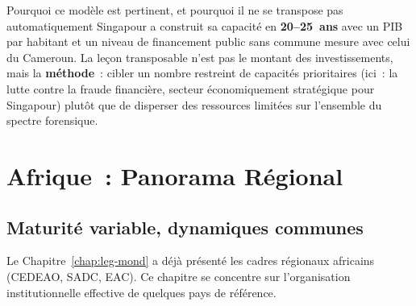 \begin{boiteRemarque}{Pourquoi ce modèle est pertinent, et pourquoi il
ne se transpose pas automatiquement}
Singapour a construit sa capacité en \textbf{20--25~ans} avec un
PIB par habitant et un niveau de financement public sans commune
mesure avec celui du Cameroun. La leçon transposable n'est pas le
montant des investissements, mais la \textbf{méthode}~: cibler un
nombre restreint de capacités prioritaires (ici~: la lutte contre
la fraude financière, secteur économiquement stratégique pour
Singapour) plutôt que de disperser des ressources limitées sur
l'ensemble du spectre forensique.
\end{boiteRemarque}

\section{Afrique~: Panorama Régional}
\label{sec:benchmark-afrique}

\subsection{Maturité variable, dynamiques communes}

Le Chapitre~\ref{chap:leg-mond} a déjà présenté les cadres régionaux
africains (CEDEAO, SADC, EAC). Ce chapitre se concentre sur
l'organisation institutionnelle effective de quelques pays de
référence.

